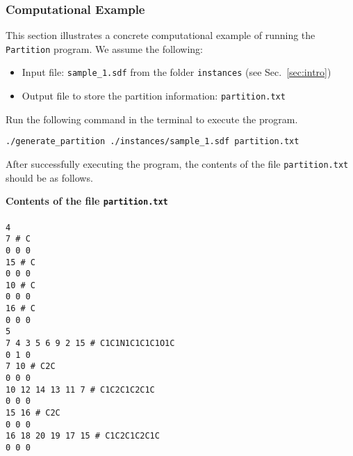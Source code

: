 \documentclass[11pt,titlepage,dvipdfmx,twoside]{article}
\begin{document}
\subsubsection{Computational Example}
\label{sec:instance_p}

This section illustrates a concrete computational 
example of running the {\tt Partition} program.
We assume the following:
%
\begin{itemize}
\item Input file: {\tt sample\_1.sdf} from the folder {\tt instances} (see Sec.~\ref{sec:intro})
\item Output file to store the partition information: {\tt partition.txt}
\end{itemize}

Run the following command in the terminal to execute the program.

\bigskip

{\tt ./generate\_partition ./instances/sample\_1.sdf partition.txt}

\bigskip

After successfully executing the program, the contents of the file 
{\tt partition.txt} should be as follows.

\begin{oframed}
{\bf Contents of the file {\tt partition.txt}}\\\\
{\tt 4 \\
7 \# C \\
0 0 0 \\
15 \# C \\
0 0 0 \\
10 \# C \\
0 0 0 \\
16 \# C \\
0 0 0 \\
5 \\
7 4 3 5 6 9 2 15 \# C1C1N1C1C1C1O1C \\
0 1 0 \\
7 10 \# C2C \\
0 0 0 \\
10 12 14 13 11 7 \# C1C2C1C2C1C \\
0 0 0 \\
15 16 \# C2C \\
0 0 0 \\
16 18 20 19 17 15 \# C1C2C1C2C1C \\
0 0 0 \\}
\end{oframed}
\end{document}
